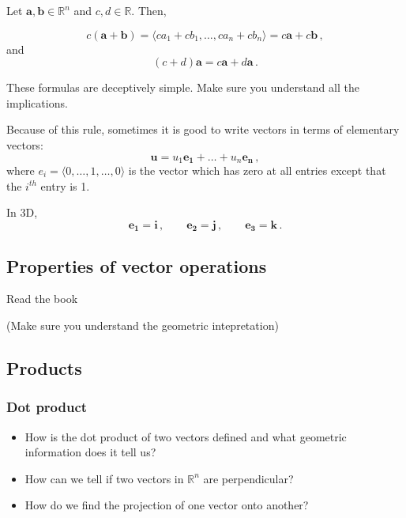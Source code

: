 \documentclass[
]{article}
\theoremstyle{definition}
\theoremstyle{definition}
\theoremstyle{definition}
\theoremstyle{definition}
\theoremstyle{remark}
\begin{document}
Let \(\textbf{a}, \textbf{b} \in \mathbb{R}^n\) and \(c,d \in \mathbb{R}\). Then,

\begin{equation*}
    c( \textbf{a} + \textbf{b}) = \langle c a_1 + c b_1, \dots, c a_n + c b_n \rangle  
    = c\textbf{a} + c\textbf{b} \,,
\end{equation*}
and
\begin{equation*}
 (c+d) \textbf{a} = c\mathbf{a} + d\mathbf{a} \,.
\end{equation*}

These formulas are deceptively simple. Make sure you understand all the implications.

Because of this rule, sometimes it is good to write vectors in terms of elementary vectors:
\begin{equation*}
    \mathbf{u} = u_1 \mathbf{e_1} + \dots + u_n \mathbf{e_n} \,,
\end{equation*}
where
\(e_i = \langle 0,\dots, 1, \dots, 0\rangle\) is the vector which has zero at all entries
except that the \(i^{th}\) entry is 1.

In 3D,
\begin{equation*}
    \mathbf{e_1} = \mathbf{i} \,, \qquad 
    \mathbf{e_2} = \mathbf{j} \,, \qquad
    \mathbf{e_3} = \mathbf{k} \,.
\end{equation*}

\subsection*{Properties of vector operations}\label{properties-of-vector-operations}

Read the book

(Make sure you understand the geometric intepretation)

\subsection{Products}\label{products}

\subsubsection{Dot product}\label{dot-product}

\begin{itemize}
\item
  How is the dot product of two vectors defined and what geometric information does it tell us?
\item
  How can we tell if two vectors in \(\mathbb{R}^n\)
  are perpendicular?
\item
  How do we find the projection of one vector onto another?
\end{itemize}
\end{document}

